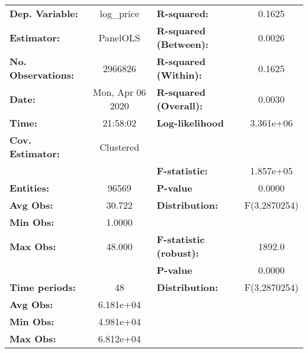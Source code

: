 \documentclass{report}
\begin{document}
\begin{center}
\begin{tabular}{lclc}
\toprule
\textbf{Dep. Variable:}      &     log\_price     & \textbf{  R-squared:         }   &      0.1625      \\
\textbf{Estimator:}          &      PanelOLS      & \textbf{  R-squared (Between):}  &      0.0026      \\
\textbf{No. Observations:}   &      2966826       & \textbf{  R-squared (Within):}   &      0.1625      \\
\textbf{Date:}               &  Mon, Apr 06 2020  & \textbf{  R-squared (Overall):}  &      0.0030      \\
\textbf{Time:}               &      21:58:02      & \textbf{  Log-likelihood     }   &    3.361e+06     \\
\textbf{Cov. Estimator:}     &     Clustered      & \textbf{                     }   &                  \\
\textbf{}                    &                    & \textbf{  F-statistic:       }   &    1.857e+05     \\
\textbf{Entities:}           &       96569        & \textbf{  P-value            }   &      0.0000      \\
\textbf{Avg Obs:}            &       30.722       & \textbf{  Distribution:      }   &   F(3,2870254)   \\
\textbf{Min Obs:}            &       1.0000       & \textbf{                     }   &                  \\
\textbf{Max Obs:}            &       48.000       & \textbf{  F-statistic (robust):} &      1892.0      \\
\textbf{}                    &                    & \textbf{  P-value            }   &      0.0000      \\
\textbf{Time periods:}       &         48         & \textbf{  Distribution:      }   &   F(3,2870254)   \\
\textbf{Avg Obs:}            &     6.181e+04      & \textbf{                     }   &                  \\
\textbf{Min Obs:}            &     4.981e+04      & \textbf{                     }   &                  \\
\textbf{Max Obs:}            &     6.812e+04      & \textbf{                     }   &                  \\
\bottomrule
\end{tabular}
\begin{tabular}{lcccccc}

\end{tabular}
\end{center}
\end{document}
